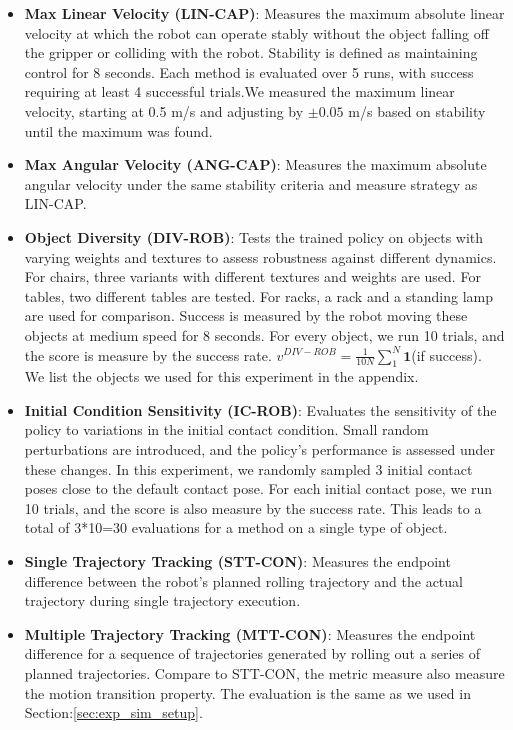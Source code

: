 \begin{itemize}
    \item \textbf{Max Linear Velocity (LIN-CAP)}: Measures the maximum absolute linear velocity at which the robot can operate stably without the object falling off the gripper or colliding with the robot. Stability is defined as maintaining control for 8 seconds. Each method is evaluated over 5 runs, with success requiring at least 4 successful trials.We measured the maximum linear velocity, starting at 0.5 m/s and adjusting by $\pm0.05$ m/s based on stability until the maximum was found.
    \item \textbf{Max Angular Velocity (ANG-CAP)}: Measures the maximum absolute angular velocity under the same stability criteria and measure strategy as LIN-CAP.
    \item \textbf{Object Diversity (DIV-ROB)}: Tests the trained policy on objects with varying weights and textures to assess robustness against different dynamics. For chairs, three variants with different textures and weights are used. For tables, two different tables are tested. For racks, a rack and a standing lamp are used for comparison. Success is measured by the robot moving these objects at medium speed for 8 seconds. For every object, we run 10 trials, and the score is measure by the success rate. $v^{DIV-ROB} = \frac{1}{10 N} 
    \sum_1^N\mathbf{1} $(if success). We list the objects we used for this experiment in the appendix.
    \item \textbf{Initial Condition Sensitivity (IC-ROB)}: Evaluates the sensitivity of the policy to variations in the initial contact condition. Small random perturbations are introduced, and the policy's performance is assessed under these changes. In this experiment, we randomly sampled 3 initial contact poses close to the default contact pose. For each initial contact pose, we run 10 trials, and the score is also measure by the success rate. This leads to a total of 3*10=30 evaluations for a method on a single type of object. 
    \item \textbf{Single Trajectory Tracking (STT-CON)}: Measures the endpoint difference between the robot's planned rolling trajectory and the actual trajectory during single trajectory execution.
    \item \textbf{Multiple Trajectory Tracking (MTT-CON)}: Measures the endpoint difference for a sequence of trajectories generated by rolling out a series of planned trajectories. Compare to STT-CON, the metric measure also measure the motion transition property. The evaluation is the same as we used in Section:\ref{sec:exp_sim_setup}.
\end{itemize}





